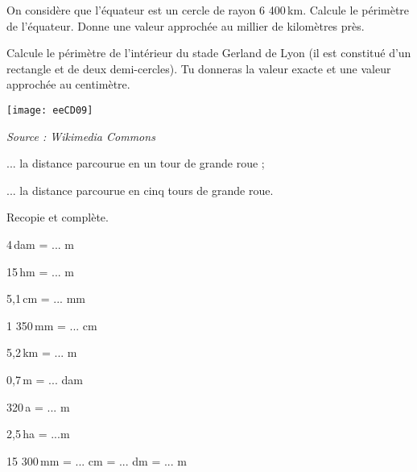\begin{exercice}[]
On considère que l'équateur est un cercle de rayon 6 400\,km. Calcule le périmètre de l'équateur. Donne une valeur approchée au millier de kilomètres près.
\end{exercice}

\begin{exercice}[]
Calcule le périmètre de l'intérieur du stade Gerland de Lyon (il est constitué d'un rectangle et de deux demi-cercles). Tu donneras la valeur exacte et une valeur approchée au centimètre.

\begin{center}
    \texttt{[image: eeCD09]}
\end{center}
\end{exercice}


\begin{exercice}[]

\hfill {\scriptsize \textit{Source : Wikimedia Commons}}


\begin{colenumerate}{1} 
\item ... la distance parcourue en un tour de grande roue ;
\item ... la distance parcourue en cinq tours de grande roue.
\end{colenumerate} 
\end{exercice}







\begin{exercice}[]
Recopie et complète.

\begin{colenumerate}{2} 
\item 4\,dam = ... m
\item 15\,hm = ... m
\item 5,1\,cm = ... mm
\item 1 350\,mm = ... cm
\item 5,2\,km = ... m
\item 0,7\,m = ... dam
\item 320\,a = ... m
\item 2,5\,ha = ...m
\item 15 300\,mm = ... cm = ... dm = ... m
\end{colenumerate} 
\end{exercice}

